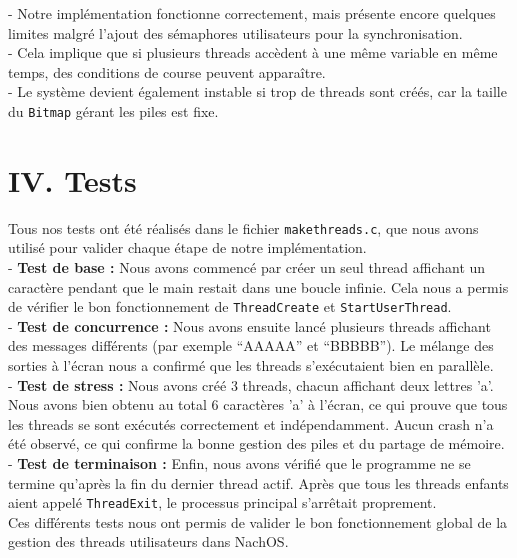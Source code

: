 \documentclass[12pt,a4paper]{report}
\begin{document}
- Notre implémentation fonctionne correctement, mais présente encore quelques limites malgré l’ajout des sémaphores utilisateurs pour la synchronisation. \\
- Cela implique que si plusieurs threads accèdent à une même variable en même temps, des conditions de course peuvent apparaître. \\
- Le système devient également instable si trop de threads sont créés, car la taille du \texttt{Bitmap} gérant les piles est fixe. \\

\section*{IV. Tests}

Tous nos tests ont été réalisés dans le fichier \texttt{makethreads.c}, que nous avons utilisé pour valider chaque étape de notre implémentation. \\

- \textbf{Test de base :} Nous avons commencé par créer un seul thread affichant un caractère pendant que le main restait dans une boucle infinie. Cela nous a permis de vérifier le bon fonctionnement de \texttt{ThreadCreate} et \texttt{StartUserThread}.\\
- \textbf{Test de concurrence :} Nous avons ensuite lancé plusieurs threads affichant des messages différents (par exemple “AAAAA” et “BBBBB”). Le mélange des sorties à l’écran nous a confirmé que les threads s’exécutaient bien en parallèle.\\
- \textbf{Test de stress :} Nous avons créé 3 threads, chacun affichant deux lettres ’a’. Nous avons bien obtenu au total 6 caractères ’a’ à l’écran, ce qui prouve que tous les threads se sont exécutés correctement et indépendamment. Aucun crash n’a été observé, ce qui confirme la bonne gestion des piles et du partage de mémoire. \\
- \textbf{Test de terminaison :} Enfin, nous avons vérifié que le programme ne se termine qu’après la fin du dernier thread actif. Après que tous les threads enfants aient appelé \texttt{ThreadExit}, le processus principal s’arrêtait proprement.\\

Ces différents tests nous ont permis de valider le bon fonctionnement global de la gestion des threads utilisateurs dans NachOS. \\
\end{document}
